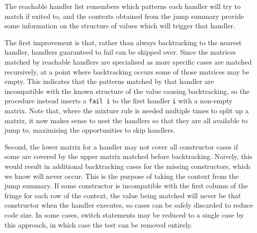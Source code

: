 The reachable handler list remembers which patterns each handler will try to match if exited to, and the contexts obtained from the jump summary provide some information on the structure of values which will trigger that handler. 

The first improvement is that, rather than always backtracking to the nearest handler, handlers guaranteed to fail can be skipped over. Since the matrices matched by reachable handlers are specialised as more specific cases are matched recursively, at a point where backtracking occurs some of those matrices may be empty. This indicates that the patterns matched by that handler are incompatible with the known structure of the value causing backtracking, so the procedure instead inserts a \verb|fail i| to the first handler \verb|i| with a non-empty matrix. Note that, where the mixture rule is needed multiple times to split up a matrix, it now makes sense to nest the handlers so that they are all available to jump to, maximising the opportunities to skip handlers.  

Second, the lower matrix for a handler may not cover all constructor cases if some are covered by the upper matrix matched before backtracking. Naively, this would result in additional backtracking cases for the missing constructors, which we know will never occur. This is the purpose of taking the context from the jump summary. If some constructor is incompatible with the first column of the fringe for each row of the context, the value being matched will never be that constructor when the handler executes, so cases can be safely discarded to reduce code size. In some cases, switch statements may be reduced to a single case by this approach, in which case the test can be removed entirely.









